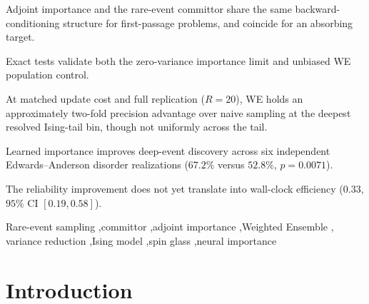 \documentclass[a4paper,fleqn]{cas-sc}
\begin{document}
\begin{highlights}
\item Adjoint importance and the rare-event committor share the same backward-conditioning
structure for first-passage problems, and coincide for an absorbing target.
\item Exact tests validate both the zero-variance importance limit and unbiased WE population
control.
\item At matched update cost and full replication ($R=20$), WE holds an approximately
two-fold precision advantage over naive sampling at the deepest resolved Ising-tail bin,
though not uniformly across the tail.
\item Learned importance improves deep-event discovery across six independent
Edwards--Anderson disorder realizations ($67.2\%$ versus $52.8\%$, $p=0.0071$).
\item The reliability improvement does not yet translate into wall-clock efficiency
($0.33$, $95\%$ CI $[0.19,0.58]$).
\end{highlights}

\begin{keywords}
Rare-event sampling \sep committor \sep adjoint importance \sep Weighted Ensemble \sep
variance reduction \sep Ising model \sep spin glass \sep neural importance
\end{keywords}

\maketitle

\section{Introduction}\label{sec:intro}
\end{document}
